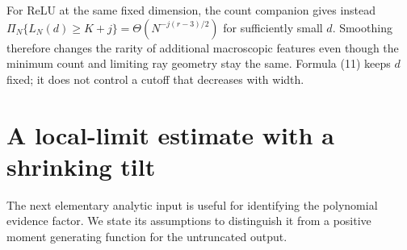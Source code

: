 \documentclass[11pt]{article}
\begin{document}
For ReLU at the same fixed dimension, the count companion gives instead
$\Pi_N\{L_N(d)\ge K+j\}=\Theta(N^{-j(r-3)/2})$ for sufficiently
small $d$. Smoothing therefore changes the rarity of additional
macroscopic features even though the minimum count and limiting ray
geometry stay the same. Formula (11) keeps $d$ fixed; it does not
control a cutoff that decreases with width.

\section{A local-limit estimate with a shrinking tilt}
The next elementary analytic input is useful for identifying the
polynomial evidence factor. We state its assumptions to distinguish it
from a positive moment generating function for the untruncated output.
\end{document}
